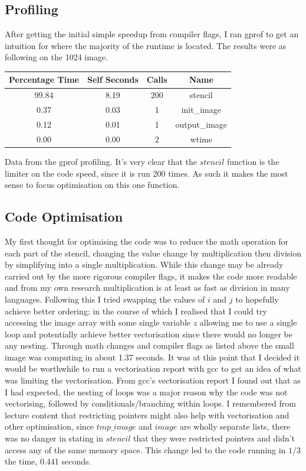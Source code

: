 \documentclass{article}
\begin{document}
    \subsection{Profiling}
    After getting the initial simple speedup from compiler flags, I ran gprof to get an intuition for where the majority of the runtime is located.
    The results were as following on the 1024 image.
    \begin{center}
    \begin{tabular}{| c | c | c | c |}
    Percentage Time & Self Seconds & Calls & Name \\ \hline
    99.84 & 8.19 & 200 & stencil \\
    0.37 & 0.03 & 1 & init\_image \\
    0.12 & 0.01 & 1 & output\_image \\
    0.00 & 0.00 & 2 & wtime
    \end{tabular}
    \end{center}
    Data from the gprof profiling. It's very clear that the $stencil$ function is the limiter on the code speed, since it is run 200 times. As such
    it makes the most sense to focus optimisation on this one function.
    \subsection{Code Optimisation}
    My first thought for optimising the code was to reduce the math operation for each part of the stencil, changing the value change by multiplication 
    then division by simplifying into a single multiplication. While this change may be already carried out by the more rigorous compiler flags, it makes
    the code more readable and from my own research multiplication is at least as fast as division in many languages.
    Following this I tried swapping the values of $i$ and $j$ to hopefully achieve better ordering; in the course of which I realised that I could try
    accessing the image array with some single variable $z$ allowing me to use a single loop and potentially achieve better vectorisation since there would
    no longer be any nesting.
    Through math changes and compiler flags as listed above the small image was computing in about 1.37 seconds. It was at this point that I decided it would
    be worthwhile to run a vectorisation report with gcc to get an idea of what was limiting the vectorisation.
    From gcc's vectorisation report I found out that as I had expected, the nesting of loops was a major reason why the code was not vectorising, followed
    by conditionals/branching within loops. I remembered from lecture content that restricting pointers might also help with vectorisation and other optimisation,
    since $tmp\_image$ and $image$ are wholly separate lists, there was no danger in stating in $stencil$ that they were restricted pointers and didn't access any
    of the same memory space. This change led to the code running in $1/3$ the time, 0.441 seconds.
\end{document}
